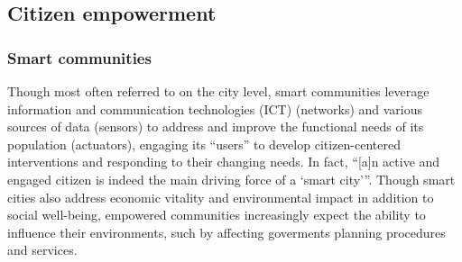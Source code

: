 \subsection{Citizen empowerment}

\subsubsection{Smart communities}
Though most often referred to on the city level, smart communities leverage information and communication technologies (ICT) (networks) and various sources of data (sensors) to address and improve the functional needs of its population (actuators), engaging its ``users'' to develop citizen-centered interventions and responding to their changing needs\cite{Williams2016,Roche2012, Afzalan2017}. %
In fact, {“[a]n active and engaged citizen is indeed the main driving force of a `smart city'''\cite{Oliveira2021}}. Though smart cities also address economic vitality and environmental impact in addition to social well-being, empowered communities increasingly expect the ability to influence their environments, such by affecting goverments planning procedures and services\cite{Williams2016}. %
